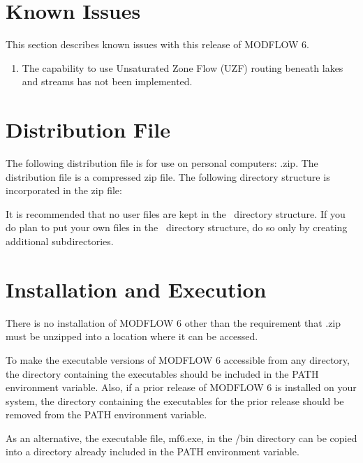 \documentclass[11pt,twoside,twocolumn]{usgsreport}
\begin{document}
\section{Known Issues}
This section describes known issues with this release of MODFLOW 6.

\begin{enumerate}

\item
The capability to use Unsaturated Zone Flow (UZF) routing beneath lakes and streams has not been implemented.

\end{enumerate}


\section{Distribution File}
The following distribution file is for use on personal computers: \modflowversion.zip.  The distribution file is a compressed zip file. The following directory structure is incorporated in the zip file:



It is recommended that no user files are kept in the \modflowversion~directory structure.  If you do plan to put your own files in the \modflowversion~directory structure, do so only by creating additional subdirectories.

\section{Installation and Execution}
There is no installation of MODFLOW 6 other than the requirement that \modflowversion.zip must be unzipped into a location where it can be accessed.  

To make the executable versions of MODFLOW 6 accessible from any directory, the directory containing the executables should be included in the PATH environment variable.  Also, if a prior release of MODFLOW 6 is installed on your system, the directory containing the executables for the prior release should be removed from the PATH environment variable.

As an alternative, the executable file, mf6.exe, in the \modflowversion{}/bin directory can be copied into a directory already included in the PATH environment variable.
\end{document}
